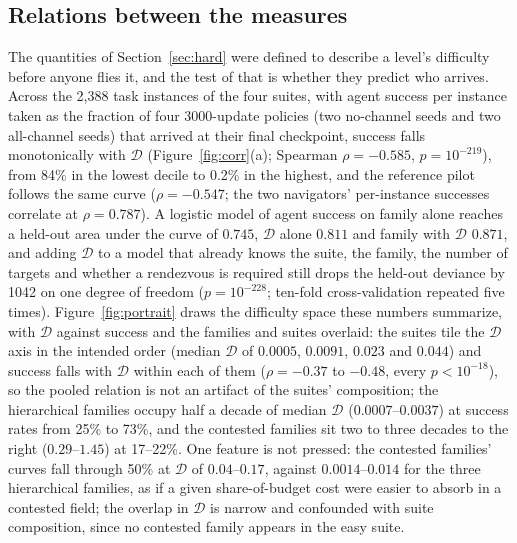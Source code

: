 \documentclass[11pt]{article}
\newcommand{\dd}{\mathcal{D}}
\begin{document}
\subsection{Relations between the measures}
\label{sec:correlations}

The quantities of Section~\ref{sec:hard} were defined to describe a level's
difficulty before anyone flies it, and the test of that is whether they
predict who arrives. Across the 2,388 task instances of the four suites,
with agent success per instance taken as the fraction of four 3000-update
policies (two no-channel seeds and two all-channel seeds) that arrived at
their final checkpoint, success falls monotonically with $\dd$
(Figure~\ref{fig:corr}(a); Spearman $\rho = -0.585$, $p = 10^{-219}$), from
84\% in the lowest decile to 0.2\% in the highest, and the reference pilot
follows the same curve ($\rho = -0.547$; the two navigators' per-instance
successes correlate at $\rho = 0.787$). A logistic model of agent success on
family alone reaches a held-out area under the curve of $0.745$, $\dd$
alone $0.811$ and family with $\dd$ $0.871$, and adding $\dd$ to a model
that already knows the suite, the family, the number of targets and whether
a rendezvous is required still drops the held-out deviance by 1042 on one
degree of freedom ($p = 10^{-228}$; ten-fold cross-validation repeated five
times). Figure~\ref{fig:portrait} draws the difficulty space
these numbers summarize, with $\dd$ against success and the families and
suites overlaid: the suites tile the $\dd$ axis in the intended order
(median $\dd$ of $0.0005$, $0.0091$, $0.023$ and $0.044$) and success falls
with $\dd$ within each of them ($\rho = -0.37$ to $-0.48$, every
$p < 10^{-18}$), so the pooled relation is not an artifact of the suites'
composition; the hierarchical families occupy half a decade of median $\dd$
($0.0007$--$0.0037$) at success rates from 25\% to 73\%, and the contested
families sit two to three decades to the right ($0.29$--$1.45$) at 17--22\%.
One feature is not pressed: the contested families' curves fall through
50\% at $\dd$ of $0.04$--$0.17$, against $0.0014$--$0.014$ for the three
hierarchical families, as if a given share-of-budget cost were easier to
absorb in a contested field; the overlap in $\dd$ is narrow and confounded
with suite composition, since no contested family appears in the easy
suite.
\end{document}
